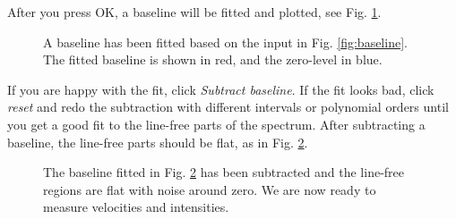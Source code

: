 \documentclass[11pt,a4paper]{article}
\begin{document}
After you press OK, a baseline will be fitted and plotted, see Fig. 
\ref{fig:baselinefit}.
\begin{figure}[h!]
  \centering
  \caption{A baseline has been fitted based on the input in Fig. 
  \ref{fig:baseline}. The fitted baseline is shown in red, and the 
  zero-level in blue.}
  \label{fig:baselinefit}
\end{figure}
If you are happy with the fit, click \emph{Subtract baseline}. If the fit looks
bad, click \emph{reset} and redo the subtraction with different intervals or
polynomial orders until you get a good fit to the line-free parts of the spectrum.
After subtracting a baseline, the line-free parts should be flat, as in 
Fig. \ref{fig:baselinesubtracted}.
\begin{figure}[h!]
  \centering
  \caption{The baseline fitted in Fig. \ref{fig:baselinesubtracted} has been
	  subtracted and the line-free regions are flat with noise around zero. We are now
	  ready to measure velocities and intensities.}
  \label{fig:baselinesubtracted}
\end{figure}
\end{document}
